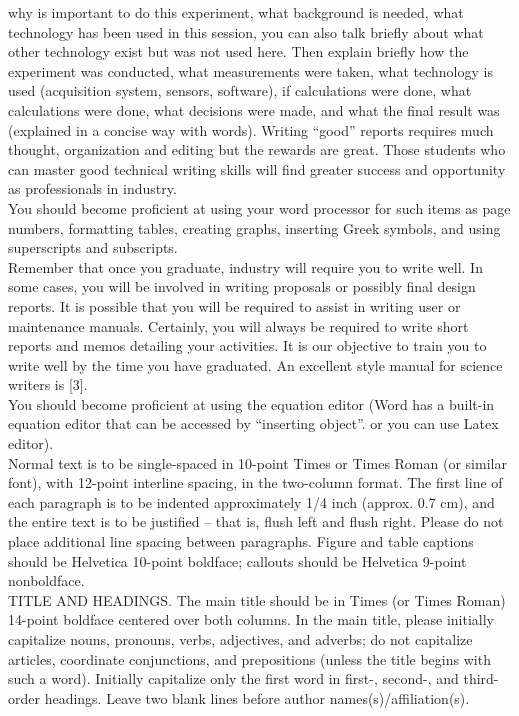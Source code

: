 \documentclass[journal]{IEEEtran}
\begin{document}
 why is important to do this experiment, what background is needed, what technology has been used in this session, you can also talk briefly about what other technology exist but was not used here.
Then explain briefly how the experiment was conducted, what measurements were taken, what technology is used (acquisition system, sensors, software), if calculations were done, what calculations were done, what decisions were made, and what the final result was (explained in a concise way with words).
Writing “good” reports requires much thought, organization and editing but the rewards are
great. Those students who can master good technical writing skills will find greater success and
opportunity as professionals in industry. \\
You should become proficient at using your word processor for such items as page
numbers, formatting tables, creating graphs, inserting Greek symbols, and using
superscripts and subscripts.  \\

Remember that once you graduate, industry will require you to write well. In some cases, you will be involved in writing proposals or possibly final design reports. It is possible that you will be required to assist in writing user or maintenance manuals. Certainly, you will always be required to write short reports and memos detailing your activities. It is our objective to train you to write well by the time you have graduated. An excellent style manual for science writers is [3]. \\
You should become proficient at using the equation editor (Word has a built-in equation editor that can be accessed by “inserting object”. or you can use Latex editor). \\

Normal text is to be single-spaced in 10-point Times or Times Roman (or similar font), with 12-point interline spacing, in the two-column 
format. The first line of each paragraph is to be indented approximately 1/4 inch (approx. 0.7 cm), and the entire text is to be justified -- that is, flush left and flush right. Please do not place additional line spacing between paragraphs. Figure and table captions should be Helvetica 10-point boldface; callouts should be Helvetica 9-point 
nonboldface.  \\

TITLE AND HEADINGS. The main title should be in Times (or Times Roman) 14-point boldface centered over both columns. In the main title, please initially capitalize nouns, pronouns, verbs, adjectives, and adverbs; do not capitalize articles, coordinate conjunctions, and prepositions (unless the title begins with such a word). Initially capitalize only the first word in first-, second-, and third-order headings. Leave two blank lines before author names(s)/affiliation(s).
\end{document}
